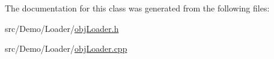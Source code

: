 The documentation for this class was generated from the following files\+:\begin{DoxyCompactItemize}
\item 
src/\+Demo/\+Loader/\hyperlink{_demo_2_loader_2_obj_loader_8h}{obj\+Loader.\+h}\item 
src/\+Demo/\+Loader/\hyperlink{_demo_2_loader_2_obj_loader_8cpp}{obj\+Loader.\+cpp}\end{DoxyCompactItemize}
